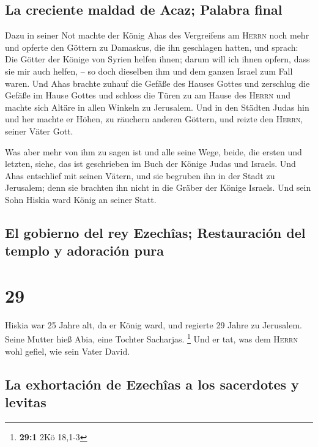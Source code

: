 \hypertarget{la-creciente-maldad-de-acaz-palabra-final}{%
\subsection{La creciente maldad de Acaz; Palabra
final}\label{la-creciente-maldad-de-acaz-palabra-final}}

 Dazu in seiner Not machte der König Ahas des Vergreifens
am \textsc{Herrn} noch mehr  und opferte den Göttern zu
Damaskus, die ihn geschlagen hatten, und sprach: Die Götter der Könige
von Syrien helfen ihnen; darum will ich ihnen opfern, dass sie mir auch
helfen, -- so doch dieselben ihm und dem ganzen Israel zum Fall waren.
 Und Ahas brachte zuhauf die Gefäße des Hauses Gottes und
zerschlug die Gefäße im Hause Gottes und schloss die Türen zu am Hause
des \textsc{Herrn} und machte sich Altäre in allen Winkeln zu Jerusalem.
 Und in den Städten Judas hin und her machte er Höhen, zu
räuchern anderen Göttern, und reizte den \textsc{Herrn}, seiner Väter
Gott.

 Was aber mehr von ihm zu sagen ist und alle seine Wege,
beide, die ersten und letzten, siehe, das ist geschrieben im Buch der
Könige Judas und Israels.  Und Ahas entschlief mit seinen
Vätern, und sie begruben ihn in der Stadt zu Jerusalem; denn sie
brachten ihn nicht in die Gräber der Könige Israels. Und sein Sohn
Hiskia ward König an seiner Statt.

\hypertarget{el-gobierno-del-rey-ezechuxeeas-restauraciuxf3n-del-templo-y-adoraciuxf3n-pura}{%
\subsection{El gobierno del rey Ezechîas; Restauración del templo y
adoración
pura}\label{el-gobierno-del-rey-ezechuxeeas-restauraciuxf3n-del-templo-y-adoraciuxf3n-pura}}

\hypertarget{section-28}{%
\section{29}\label{section-28}}

 Hiskia war 25 Jahre alt, da er König ward, und regierte
29 Jahre zu Jerusalem. Seine Mutter hieß Abia, eine Tochter Sacharjas.
\footnote{\textbf{29:1} 2Kö 18,1-3}  Und er tat, was dem
\textsc{Herrn} wohl gefiel, wie sein Vater David.

\hypertarget{la-exhortaciuxf3n-de-ezechuxeeas-a-los-sacerdotes-y-levitas}{%
\subsection{La exhortación de Ezechîas a los sacerdotes y
levitas}\label{la-exhortaciuxf3n-de-ezechuxeeas-a-los-sacerdotes-y-levitas}}

